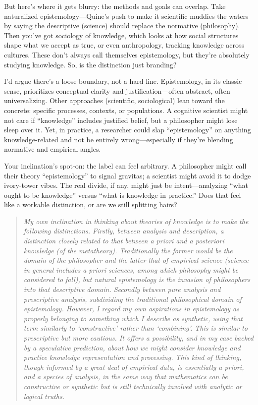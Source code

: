 \documentclass[10pt,titlepage]{book}
\begin{document}
But here’s where it gets blurry: the methods and goals can overlap. Take naturalized epistemology—Quine’s push to make it scientific muddies the waters by saying the descriptive (science) should replace the normative (philosophy). Then you’ve got sociology of knowledge, which looks at how social structures shape what we accept as true, or even anthropology, tracking knowledge across cultures. These don’t always call themselves epistemology, but they’re absolutely studying knowledge. So, is the distinction just branding?

I’d argue there’s a loose boundary, not a hard line. Epistemology, in its classic sense, prioritizes conceptual clarity and justification—often abstract, often universalizing. Other approaches (scientific, sociological) lean toward the concrete: specific processes, contexts, or populations. A cognitive scientist might not care if “knowledge” includes justified belief, but a philosopher might lose sleep over it. Yet, in practice, a researcher could slap “epistemology” on anything knowledge-related and not be entirely wrong—especially if they’re blending normative and empirical angles.

Your inclination’s spot-on: the label can feel arbitrary. A philosopher might call their theory “epistemology” to signal gravitas; a scientist might avoid it to dodge ivory-tower vibes. The real divide, if any, might just be intent—analyzing “what ought to be knowledge” versus “what is knowledge in practice.” Does that feel like a workable distinction, or are we still splitting hairs?

\begin{quote}
  {\it My own inclination in thinking about theories of knowledge is to make the following distinctions.   Firstly, between analysis and description, a distinction closely related to that between a priori and a posteriori knowledge (of the metatheory).  Traditionally the former would be the domain of the philosopher and the latter that of empirical science (science in general includes a priori sciences, among which philosophy might be considered to fall), but natural epistemology is the invasion of philosophers into that descriptive domain.  Secondly between pure analysis and prescriptive analysis, subdividing the traditional philosophical domain of epistemology.  However, I regard my own aspirations in epistemology as properly belonging to something which I describe as synthetic, using that term similarly to `constructive' rather than `combining'.  This is similar to prescriptive but more cautious.  It offers a possibility, and in my case backed by a speculative prediction, about how we might consider knowledge and practice knowledge representation and processing.  This kind of thinking, though informed by a great deal of empirical data, is essentially a priori, and a species of analysis, in the same way that mathematics can be constructive or synthetic but is still technically involved with analytic or logical truths.}
\end{quote}
\end{document}
